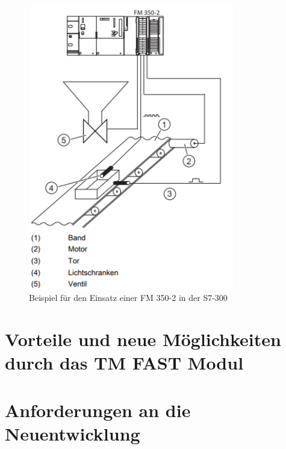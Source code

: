 \begin{figure}[H]
    \centering
    \includegraphics[width=0.8\textwidth]{Fotos/Beispiel_fm350-2.png}
    \caption{Beispiel für den Einsatz einer FM 350-2 in der S7-300 \cite{fm350_Handbuch}}
    \label{fig:fm350-2}
\end{figure}



\section{Vorteile und neue Möglichkeiten durch das TM FAST Modul} 

\section{Anforderungen an die Neuentwicklung} 


